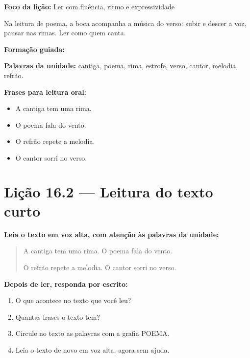 \textbf{Foco da lição:} Ler com fluência, ritmo e expressividade


\begin{boquinha}
Na leitura de poema, a boca acompanha a música do verso: subir e descer a voz, pausar nas rimas. Ler como quem canta.
\end{boquinha}

\noindent\textbf{Formação guiada:}

\begin{center}
\end{center}

\noindent\textbf{Palavras da unidade:} cantiga, poema, rima, estrofe, verso, cantor, melodia, refrão.

\noindent\textbf{Frases para leitura oral:}
\begin{itemize}[leftmargin=1.6em]
  \item A cantiga tem uma rima.
  \item O poema fala do vento.
  \item O refrão repete a melodia.
  \item O cantor sorri no verso.
\end{itemize}

\section{Lição 16.2 --- Leitura do texto curto}

\noindent\textbf{Leia o texto em voz alta, com atenção às palavras da unidade:}


\begin{quote}
A cantiga tem uma rima. O poema fala do vento.

O refrão repete a melodia. O cantor sorri no verso.
\end{quote}

\textbf{Depois de ler, responda por escrito:}
\begin{enumerate}

  \item O que acontece no texto que você leu?
  \begin{center}
  \underline{\hspace{12cm}}
  \end{center}

  \item Quantas frases o texto tem?
  \begin{center}
  \underline{\hspace{12cm}}
  \end{center}

  \item Circule no texto as palavras com a grafia POEMA.

  \item Leia o texto de novo em voz alta, agora sem ajuda.

\end{enumerate}

